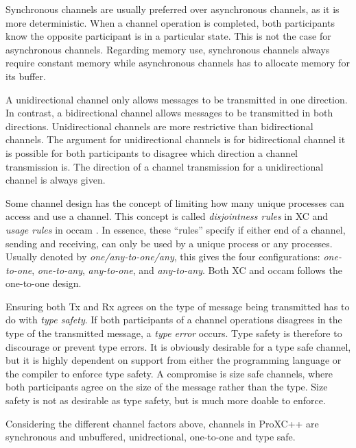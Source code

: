 Synchronous channels are usually preferred over asynchronous channels, as it is more deterministic. When a channel operation is completed, both participants know the opposite participant is in a particular state. This is not the case for asynchronous channels. Regarding memory use, synchronous channels always require constant memory while asynchronous channels has to allocate memory for its buffer.

A unidirectional channel only allows messages to be transmitted in one direction. In contrast, a bidirectional channel allows messages to be transmitted in both directions. Unidirectional channels are more restrictive than bidirectional channels. The argument for unidirectional channels is for bidirectional channel it is possible for both participants to disagree which direction a channel transmission is. The direction of a channel transmission for a unidirectional channel is always given.

Some channel design has the concept of limiting how many unique processes can access and use a channel. This concept is called \textit{disjointness rules} in XC \citep{douglas2009programming} and \textit{usage rules} in occam \citep{barrett1992occam}. In essence, these ``rules'' specify if either end of a channel, sending and receiving, can only be used by a unique process or any processes. Usually denoted by \textit{one/any\hyp{}to\hyp{}one/any}, this gives the four configurations: \textit{one\hyp{}to\hyp{}one}, \textit{one\hyp{}to\hyp{}any}, \textit{any\hyp{}to\hyp{}one}, and \textit{any\hyp{}to\hyp{}any}. Both XC and occam follows the one\hyp{}to\hyp{}one design.

Ensuring both Tx and Rx agrees on the type of message being transmitted has to do with \textit{type safety}. If both participants of a channel operations disagrees in the type of the transmitted message, a \textit{type error} occurs. Type safety is therefore to discourage or prevent type errors. It is obviously desirable for a type safe channel, but it is highly dependent on support from either the programming language or the compiler to enforce type safety. A compromise is size safe channels, where both participants agree on the size of the message rather than the type. Size safety is not as desirable as type safety, but is much more doable to enforce.

Considering the different channel factors above, channels in ProXC++ are synchronous and unbuffered, unidrectional, one\hyp{}to\hyp{}one and type safe.


